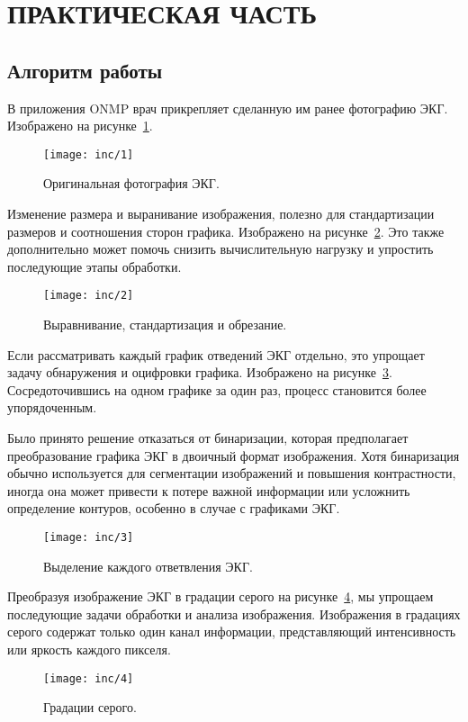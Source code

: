 \section{ПРАКТИЧЕСКАЯ ЧАСТЬ}
\subsection{Алгоритм работы}

В приложения ONMP врач прикрепляет сделанную им ранее фотографию ЭКГ.
Изображено на рисунке~\ref{fig:fig1}.
\begin{figure}
  \texttt{[image: inc/1]}
  \caption{Оригинальная фотография ЭКГ.}
  \label{fig:fig1}
\end{figure}

Изменение размера и выранивание изображения, полезно для стандартизации размеров и соотношения сторон графика. Изображено на рисунке~\ref{fig:fig2}. Это также дополнительно может помочь снизить вычислительную нагрузку и упростить последующие этапы обработки.

\begin{figure}
  \texttt{[image: inc/2]}
  \caption{Выравнивание, стандартизация и обрезание.}
  \label{fig:fig2}
\end{figure}

Если рассматривать каждый график отведений ЭКГ отдельно, это упрощает задачу обнаружения и оцифровки графика. Изображено на рисунке~\ref{fig:fig3}. Сосредоточившись на одном графике за один раз, процесс становится более упорядоченным.

Было принято решение отказаться от бинаризации, которая предполагает преобразование графика ЭКГ в двоичный формат изображения. Хотя бинаризация обычно используется для сегментации изображений и повышения контрастности, иногда она может привести к потере важной информации или усложнить определение контуров, особенно в случае с графиками ЭКГ.

\begin{figure}
  \texttt{[image: inc/3]}
  \caption{Выделение каждого ответвления ЭКГ.}
  \label{fig:fig3}
\end{figure}

Преобразуя изображение ЭКГ в градации серого на рисунке~\ref{fig:fig4}, мы упрощаем последующие задачи обработки и анализа изображения. Изображения в градациях серого содержат только один канал информации, представляющий интенсивность или яркость каждого пикселя. 

\begin{figure}
  \texttt{[image: inc/4]}
  \caption{Градации серого.}
  \label{fig:fig4}
\end{figure}

